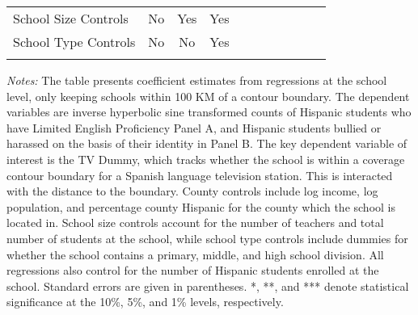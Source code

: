 \begin{table}[!h]
{\begin{threeparttable}
\begin{tabular}{lcccccccccc}
                                School Size Controls & No & Yes & Yes\\
                                School Type Controls & No & No & Yes \\
				\addlinespace\hline\hline
			\end{tabular}
			\begin{tablenotes}[flushleft]
				\item \textit{Notes:} The table presents coefficient estimates from regressions at the school level, only keeping schools within 100 KM of a contour boundary. The dependent variables are inverse hyperbolic sine transformed counts of Hispanic students who have Limited English Proficiency Panel A, and Hispanic students bullied or harassed on the basis of their identity in Panel B. The key dependent variable of interest is the TV Dummy, which tracks whether the school is within a coverage contour boundary for a Spanish language television station. This is interacted with the distance to the boundary. County controls include log income, log population, and percentage county Hispanic for the county which the school is located in. School size controls account for the number of teachers and total number of students at the school, while school type controls include dummies for whether the school contains a primary, middle, and high school division. All regressions also control for the number of Hispanic students enrolled at the school. Standard errors are given in parentheses. *, **, and *** denote statistical significance at the 10\%, 5\%, and 1\% levels, respectively.
			\end{tablenotes}
		\end{threeparttable}
	}
\end{table}